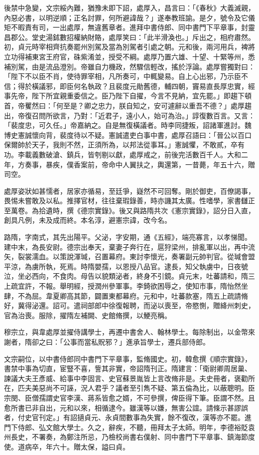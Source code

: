 \begin{pinyinscope}
 後禁中急變，文宗綏內難，猶豫未即下詔，處厚入，昌言曰：「《春秋》大義滅親，內惡必書，以明逆順；正名討罪，何所避諱哉？」遂奉教班諭。是夕，號令及它儀矩不暇責有司，一出處厚，無違舊章者。進拜中書侍郎、同中書門下平章事，封靈昌郡公。堂史湯鉥數招權納財賂，處厚笑曰：「此半滑渙也。」斥出之，相府肅然。初，貞元時宰相齊抗奏罷州別駕及當為別駕者引處之朝。元和後，兩河用兵，裨將立功得補東宮王府官，硃紫淆並，授受不綱。處厚乃置六雄、十望、十緊等州，悉補別駕，由是流品澄別。帝雖自力機政，然驟信輕改，搖於浮論。處厚嘗獨對曰：「陛下不以臣不肖，使待罪宰相，凡所奏可，中輒變易。自上心出邪，乃示臣不信；得於橫議邪，即臣何名執政？且裴度元勛舊德，輔四朝，竇易直長厚忠實，經事先帝，陛下所宜親重委信之。臣乃陛下自擢，今言不見納，宜先罷。」即趨下頓首，帝矍然曰：「何至是？卿之忠力，朕自知之，安可遽辭以重吾不德？」處厚趨出，帝復召問所欲言，乃對：「近君子，遠小人，始可為治。」諄復數百言。又言：「裴度忠，可久任。」帝嘉納之。自是無復橫議者。時李同捷叛，詔諸軍進討。魏博史憲誠懷向背，裴度待以不疑。憲誠遣吏白事中書，處厚召語曰：「晉公以百口保爾帥於天子，我則不然，正須所為，以邦法從事耳。」憲誠懼，不敢貳，卒有功。李載義數破滄、鎮兵，皆刳剔以獻，處厚戒之，前後完活數百千人。大和二年，方奏事，暴疾，僕香案前，帝命中人翼扶之，輿還第，一昔薨，年五十六，贈司空。



 處厚姿狀如甚懦者，居家亦循易，至廷爭，嶷然不可回奪。剛於御吏，百僚謁事，畏惕未嘗敢及以私。推擇官材，往往棄瑕錄善，時亦譏其太廣。性嗜學，家書讎正至萬卷。為拾遺時，撰《德宗實錄》。後又與路隋共次《憲宗實錄》，詔分日入直，創具凡例，未及成而終。本名淳，避憲宗諱，改今名。



 路隋，字南式，其先出陽平。父泌，字安期，通《五經》，端亮寡言，以孝悌聞。建中末，為長安尉。德宗出奉天，棄妻子奔行在，扈狩梁州，排亂軍以出，再中流矢，裂裳濡血。以策說渾瑊，召置幕府。東討李懷光，奏署副元帥判官。從瑊會盟平涼，為虜所執，死焉。時隋嬰孺，以恩授八品官。逮長，知父執虜中，日夜號泣，坐必西向，不食肉。母告以貌類泌者，終身不引鏡。貞元末，吐蕃請和，隋三上疏宜許，不報。舉明經，授潤州參軍事。李錡欲困辱之，使知市事，隋怡然坐肆，不為屈。韋夏卿高其節，闢置東都幕府。元和中，吐蕃款塞，隋五上疏請脩好，冀得泌還。詔可。遣祠部郎中徐復報聘，而泌以喪至，帝愍惻，贈絳州刺史，官為治喪。服除，擢隋左補闕、史館脩撰，以鯁亮稱。



 穆宗立，與韋處厚並擢侍講學士，再遷中書舍人、翰林學士。每除制出，以金幣來謝者，隋卻之曰：「公事而當私貺邪？」進承旨學士，遷兵部侍郎。



 文宗嗣位，以中書侍郎同中書門下平章事，監脩國史。初，韓愈撰《順宗實錄》，書禁中事為切直，宦豎不喜，訾其非實，帝詔隋刊正。隋建言：「衛尉卿周居巢、諫議大夫王彥威、給事中李固言、史官蘇景胤皆上言改脩非是。夫史冊者，褒勸所在，匹夫美惡尚不可誣，況人君乎？議者至引雋不疑、第五倫為比，以蔽聰明。臣宗閔、臣僧孺謂史官李漢、蔣系皆愈之婿，不可參撰，俾臣得下筆。臣謂不然。且愈所書已非自出，元和以來，相循逮今。雖漢等以嫌，無害公誼。請條示甚謬誤者，付史官刊定。」有詔擿貞元、永貞間數事為失實，餘不復改，漢等亦不罷。進門下侍郎、弘文館大學士。久之，辭疾，不聽，冊拜太子太師。明年，李德裕貶袁州長史，不署奏，為鄭注所忌，乃檢校尚書右僕射、同中書門下平章事、鎮海節度使。道病卒，年六十。贈太保，謚曰貞。




\end{pinyinscope}
